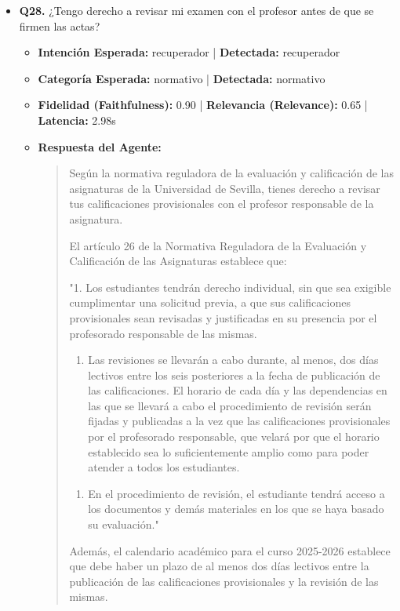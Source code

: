 \documentclass[12pt,a4paper,oneside]{report}
\begin{document}
\begin{itemize}
  
\item \textbf{Q28.} ¿Tengo derecho a revisar mi examen con el profesor antes de que se firmen las actas? \\
        \begin{itemize}
          \item \textbf{Intención Esperada:} recuperador | \textbf{Detectada:} recuperador
          \item \textbf{Categoría Esperada:} normativo | \textbf{Detectada:} normativo
          \item \textbf{Fidelidad (Faithfulness):} 0.90 | \textbf{Relevancia (Relevance):} 0.65 | \textbf{Latencia:} 2.98s
          \item \textbf{{Respuesta del Agente:}} \\
                \begin{quote}
Según la normativa reguladora de la evaluación y calificación de las asignaturas de la Universidad de Sevilla, tienes derecho a revisar tus calificaciones provisionales con el profesor responsable de la asignatura.

El artículo 26 de la Normativa Reguladora de la Evaluación y Calificación de las Asignaturas establece que:

"1. Los estudiantes tendrán derecho individual, sin que sea exigible cumplimentar una solicitud previa, a que sus calificaciones provisionales sean revisadas y justificadas en su presencia por el profesorado responsable de las mismas.

\begin{enumerate}
  \item Las revisiones se llevarán a cabo durante, al menos, dos días lectivos entre los seis posteriores a la fecha de publicación de las calificaciones. El horario de cada día y las dependencias en las que se llevará a cabo el procedimiento de revisión serán fijadas y publicadas a la vez que las calificaciones provisionales por el profesorado responsable, que velará por que el horario establecido sea lo suficientemente amplio como para poder atender a todos los estudiantes.
\end{enumerate}

\begin{enumerate}
  \item En el procedimiento de revisión, el estudiante tendrá acceso a los documentos y demás materiales en los que se haya basado su evaluación."
\end{enumerate}

Además, el calendario académico para el curso 2025-2026 establece que debe haber un plazo de al menos dos días lectivos entre la publicación de las calificaciones provisionales y la revisión de las mismas.


\end{quote}
\end{itemize}
\end{itemize}
\end{document}
